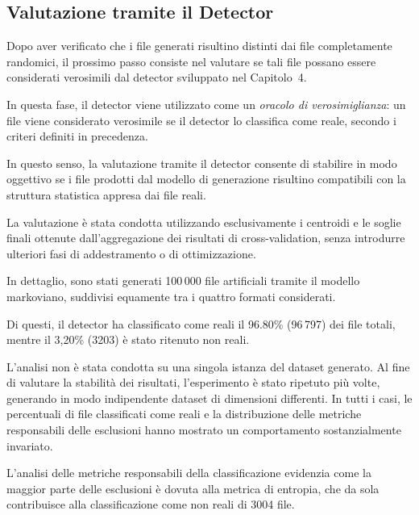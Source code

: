 \documentclass{report}
\begin{document}
\subsection{Valutazione tramite il Detector}

Dopo aver verificato che i file generati risultino distinti dai file completamente randomici,
il prossimo passo consiste nel valutare se tali file possano essere considerati verosimili
dal detector sviluppato nel Capitolo~4.

\bigskip

In questa fase, il detector viene utilizzato come un \emph{oracolo di verosimiglianza}:
un file viene considerato verosimile se il detector lo classifica come reale,
secondo i criteri definiti in precedenza.

In questo senso, la valutazione tramite il detector consente di stabilire in modo oggettivo se i
file prodotti dal modello di generazione risultino compatibili con la struttura
statistica appresa dai file reali.

\bigskip

La valutazione è stata condotta utilizzando esclusivamente i centroidi e le
soglie finali ottenute dall’aggregazione dei risultati di cross-validation,
senza introdurre ulteriori fasi di addestramento o di ottimizzazione. 

\bigskip

In dettaglio, sono stati generati 100\,000 file artificiali tramite il modello markoviano,
suddivisi equamente tra i quattro formati considerati.

Di questi, il detector ha classificato come reali il 96.80\% (96\,797) dei file totali, 
mentre il 3,20\% (3203) è stato ritenuto non reali.

\bigskip

L’analisi non è stata condotta su una singola istanza del dataset generato.
Al fine di valutare la stabilità dei risultati, l’esperimento è stato ripetuto
più volte, generando in modo indipendente dataset di dimensioni differenti.
In tutti i casi, le percentuali di file classificati come reali e la
distribuzione delle metriche responsabili delle esclusioni hanno mostrato un
comportamento sostanzialmente invariato.


\bigskip

L'analisi delle metriche responsabili della classificazione evidenzia come la
maggior parte delle esclusioni è dovuta alla metrica di entropia, che da sola
contribuisce alla classificazione come non reali di 3004 file.
\end{document}
